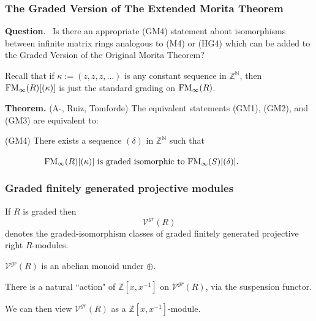 \documentclass{beamer}
\begin{document}
\begin{frame}
\frametitle{The Graded Version of The Extended Morita Theorem}

{\bf Question}.  \ Is there an appropriate (GM4) statement about isomorphisms between infinite matrix rings analogous to (M4) or (HG4) which can be added to the Graded Version of the Original Morita Theorem?

\pause
\medskip

Recall that if $\kappa := (z,z,z, \dots)$ is any constant sequence in $\mathbb{Z}^{\mathbb{N}}$, then ${\rm FM}_\infty(R)[(\kappa)]$ is just the standard grading on ${\rm FM}_\infty(R)$.    

\bigskip

{\bf Theorem.}  (A-, Ruiz, Tomforde)     The equivalent statements (GM1), (GM2), and (GM3) are equivalent to:

\bigskip

(GM4)  There exists a sequence $(\delta)$ in $\mathbb{Z}^{\mathbb{N}}$ such that 

\medskip
 \ \ \ \ \ \ \ \ \  ${\rm FM}_\infty(R)[(\kappa)] \mbox{ is graded isomorphic to }{\rm FM}_\infty(S) [ (\delta) ].$

\end{frame}







\begin{frame}
\frametitle{Graded finitely generated projective modules }


If $R$ is graded then $$ \mathcal{V}^{gr}(R)$$ denotes the graded-isomorphism classes of graded finitely generated projective right $R$-modules.  

\medskip

   $ \mathcal{V}^{gr}(R)$ is an abelian monoid under $\oplus$.   

\bigskip
\pause

  There is a natural ``action" of $\mathbb{Z}[x,x^{-1}]$ on   $ \mathcal{V}^{gr}(R)$, via the suspension functor.    
  
  \medskip
  
    We can then view $ \mathcal{V}^{gr}(R)$ as a $\mathbb{Z}[x,x^{-1}]$-module.  


\bigskip
\bigskip


\end{frame}
\end{document}
